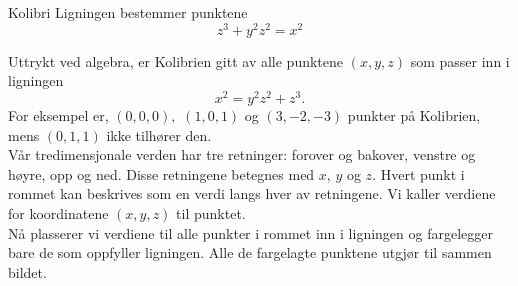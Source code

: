 \begin{surferPage}{Kolibri}
Ligningen bestemmer punktene\\
  
  \smallskip
\[z^3+ y^2	z^2	= x^2\]

\singlespacing
Uttrykt ved algebra, er Kolibrien gitt av alle punktene $(x, y, z)$ som passer inn i ligningen
\smallskip
\[ x^2= y^2z^2+z^3.\]
\smallskip
For eksempel er, $(0,0,0),$ $(1,0,1)$ og $(3,-2,-3)$ punkter på Kolibrien, mens $(0,1,1)$ ikke tilhører den.\\
 \singlespacing
Vår tredimensjonale verden har tre retninger: forover og bakover, venstre og høyre, opp og ned. Disse retningene betegnes med $x$, $y$ og $z$. Hvert punkt i rommet kan beskrives som en verdi langs hver av retningene. Vi kaller verdiene for koordinatene $(x,y,z)$ til punktet.\\
\singlespacing
Nå plasserer vi verdiene til alle punkter i rommet inn i ligningen og fargelegger bare de som oppfyller ligningen. Alle de fargelagte punktene utgjør til sammen bildet.
\end{surferPage}
